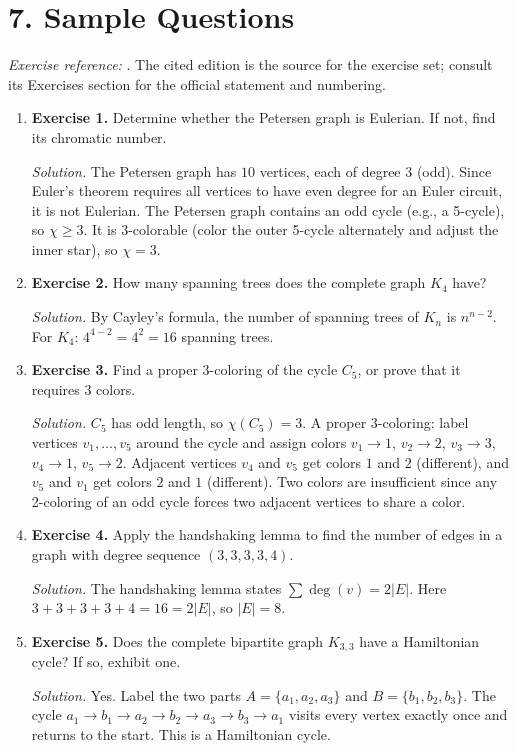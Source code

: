 \section*{7. Sample Questions}
\emph{Exercise reference:} \cite{graph_theory_ref1}. The cited edition is the source for the exercise set; consult its Exercises section for the official statement and numbering.
\begin{enumerate}[leftmargin=*,itemsep=0.9em]
\item \textbf{Exercise 1.} Determine whether the Petersen graph is Eulerian. If not, find its chromatic number.

\emph{Solution.} The Petersen graph has $10$ vertices, each of degree $3$ (odd). Since Euler's theorem requires all vertices to have even degree for an Euler circuit, it is not Eulerian. The Petersen graph contains an odd cycle (e.g., a 5-cycle), so $\chi\geq 3$. It is $3$-colorable (color the outer 5-cycle alternately and adjust the inner star), so $\chi=3$.

\item \textbf{Exercise 2.} How many spanning trees does the complete graph $K_4$ have?

\emph{Solution.} By Cayley's formula, the number of spanning trees of $K_n$ is $n^{n-2}$. For $K_4$: $4^{4-2}=4^2=16$ spanning trees.

\item \textbf{Exercise 3.} Find a proper $3$-coloring of the cycle $C_5$, or prove that it requires $3$ colors.

\emph{Solution.} $C_5$ has odd length, so $\chi(C_5)=3$. A proper $3$-coloring: label vertices $v_1,\ldots,v_5$ around the cycle and assign colors $v_1\to 1$, $v_2\to 2$, $v_3\to 3$, $v_4\to 1$, $v_5\to 2$. Adjacent vertices $v_4$ and $v_5$ get colors $1$ and $2$ (different), and $v_5$ and $v_1$ get colors $2$ and $1$ (different). Two colors are insufficient since any 2-coloring of an odd cycle forces two adjacent vertices to share a color.

\item \textbf{Exercise 4.} Apply the handshaking lemma to find the number of edges in a graph with degree sequence $(3,3,3,3,4)$.

\emph{Solution.} The handshaking lemma states $\sum\deg(v)=2|E|$. Here $3+3+3+3+4=16=2|E|$, so $|E|=8$.

\item \textbf{Exercise 5.} Does the complete bipartite graph $K_{3,3}$ have a Hamiltonian cycle? If so, exhibit one.

\emph{Solution.} Yes. Label the two parts $A=\{a_1,a_2,a_3\}$ and $B=\{b_1,b_2,b_3\}$. The cycle $a_1\to b_1\to a_2\to b_2\to a_3\to b_3\to a_1$ visits every vertex exactly once and returns to the start. This is a Hamiltonian cycle.

\end{enumerate}
